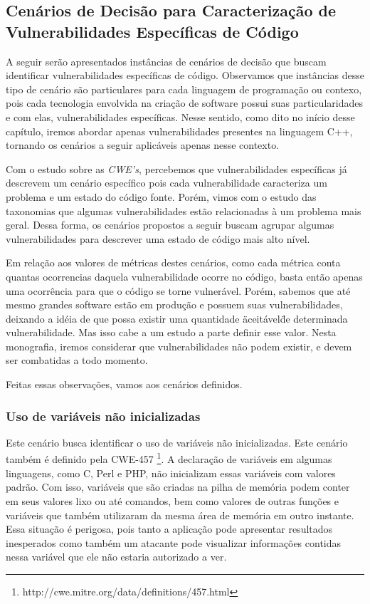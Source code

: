 \subsection{Cenários de Decisão para Caracterização de Vulnerabilidades Específicas de Código}

A seguir serão apresentados instâncias de cenários de decisão que buscam identificar vulnerabilidades específicas de código. Observamos que instâncias desse tipo de cenário são particulares para cada linguagem de programação ou contexo, pois cada tecnologia envolvida na criação de software possui suas particularidades e com elas, vulnerabilidades específicas. Nesse sentido, como dito no início desse capítulo, iremos abordar apenas vulnerabilidades presentes na linguagem C++, tornando os cenários a seguir aplicáveis apenas nesse contexto.

Com o estudo sobre as \emph{CWE's}, percebemos que vulnerabilidades específicas já descrevem um cenário específico pois cada vulnerabilidade caracteriza um problema e um estado do código fonte. Porém, vimos com o estudo das taxonomias que algumas vulnerabilidades estão relacionadas à um problema mais geral. Dessa forma, os cenários propostos a seguir buscam agrupar algumas vulnerabilidades para descrever uma estado de código mais alto nível.

Em relação aos valores de métricas destes cenários, como cada métrica conta quantas ocorrencias daquela vulnerabilidade ocorre no código, basta então apenas uma ocorrência para que o código se torne vulnerável. Porém, sabemos que até mesmo grandes software estão em produção e possuem suas vulnerabilidades, deixando a idéia de que possa existir uma quantidade \"aceitável\" de determinada vulnerabilidade. Mas isso cabe a um estudo a parte definir esse valor. Nesta monografia, iremos considerar que vulnerabilidades não podem existir, e devem ser combatidas a todo momento.

Feitas essas observações, vamos aos cenários definidos.


\subsubsection{Uso de variáveis não inicializadas}

Este cenário busca identificar o uso de variáveis não inicializadas. Este cenário também é definido pela CWE-457 \footnote{http://cwe.mitre.org/data/definitions/457.html}.
%
A declaração de variáveis em algumas linguagens, como C, Perl e PHP, não inicializam essas variáveis com valores padrão. Com isso, variáveis que são criadas na pilha de memória podem conter em seus valores lixo ou até comandos, bem como valores de outras funções e variáveis que também utilizaram da mesma área de memória em outro instante.
%
Essa situação é perigosa, pois tanto a aplicação pode apresentar resultados inesperados como também um atacante pode visualizar informações contidas nessa variável que ele não estaria autorizado a ver. 

